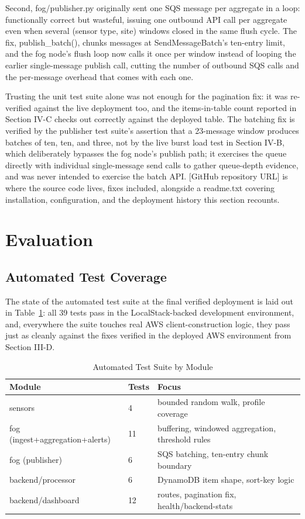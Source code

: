 \documentclass[conference]{IEEEtran}
\begin{document}
Second, fog/publisher.py originally sent one SQS message per aggregate in a loop: functionally correct but wasteful, issuing one outbound API call per aggregate even when several (sensor type, site) windows closed in the same flush cycle. The fix, publish\_batch(), chunks messages at SendMessageBatch's ten-entry limit, and the fog node's flush loop now calls it once per window instead of looping the earlier single-message publish call, cutting the number of outbound SQS calls and the per-message overhead that comes with each one.

Trusting the unit test suite alone was not enough for the pagination fix: it was re-verified against the live deployment too, and the items-in-table count reported in Section IV-C checks out correctly against the deployed table. The batching fix is verified by the publisher test suite's assertion that a 23-message window produces batches of ten, ten, and three, not by the live burst load test in Section IV-B, which deliberately bypasses the fog node's publish path; it exercises the queue directly with individual single-message send calls to gather queue-depth evidence, and was never intended to exercise the batch API. [GitHub repository URL] is where the source code lives, fixes included, alongside a readme.txt covering installation, configuration, and the deployment history this section recounts.

\section{Evaluation}

\subsection{Automated Test Coverage}
The state of the automated test suite at the final verified deployment is laid out in Table~\ref{tab:tests}: all 39 tests pass in the LocalStack-backed development environment, and, everywhere the suite touches real AWS client-construction logic, they pass just as cleanly against the fixes verified in the deployed AWS environment from Section III-D.

\begin{table}[!t]
\caption{Automated Test Suite by Module}
\label{tab:tests}
\centering
\footnotesize
\begin{tabular}{|p{10.5em}|p{2.5em}|p{11.5em}|}
\hline
\textbf{Module} & \textbf{Tests} & \textbf{Focus} \\
\hline
sensors & 4 & bounded random walk, profile coverage \\
\hline
fog (ingest+aggregation+alerts) & 11 & buffering, windowed aggregation, threshold rules \\
\hline
fog (publisher) & 6 & SQS batching, ten-entry chunk boundary \\
\hline
backend/processor & 6 & DynamoDB item shape, sort-key logic \\
\hline
backend/dashboard & 12 & routes, pagination fix, health/backend-stats \\
\hline
\end{tabular}
\end{table}
\end{document}
